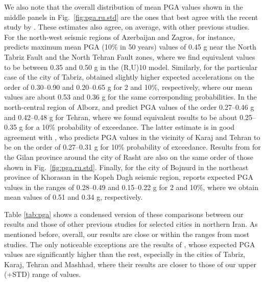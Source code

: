 We also note that the overall distribution of mean PGA values shown in the middle panels in Fig.~\ref{fig:pga.ru.std} are the ones that best agree with the recent study by \citet{Khodaverdian_2016_BSSA}. These estimates also agree, on average, with other previous studies. For the north-west seismic regions of Azerbaijan and Zagros, for instance, \citet{Tavakoli1999} predicts maximum mean PGA (10\% in 50 years) values of 0.45 g near the North Tabriz Fault and the North Tehran Fault zones, where we find equivalent values to be between 0.35 and 0.50 g in the (R,U)10 model. Similarly, for the particular case of the city of Tabriz, \citet{Vafaie2011} obtained slightly higher expected accelerations on the order of 0.30--0.90 and 0.20--0.65 g for 2 and 10\%, respectively, where our mean values are about 0.53 and 0.36 g for the same corresponding probabilities. In the north-central region of Alborz, \citet{Ghodrati2003} and \citet{Boostan2015} predict PGA values of the order 0.27--0.46 g and 0.42--0.48 g for Tehran, where we found equivalent results to be about 0.25--0.35 g for a 10\% probability of exceedance. The latter estimate is in good agreement with \citet{Abdi2013}, who predicts PGA values in the vicinity of Karaj and Tehran to be on the order of 0.27--0.31 g for 10\% probability of exceedance. Results from \citet{Ghodrati2008} for the Gilan province around the city of Rasht are also on the same order of those shown in Fig.~\ref{fig:pga.ru.std}. Finally, for the city of Bojnurd in the northeast province of Khorasan in the Kopeh Dagh seismic region, \citet{Rahgozar2012} reports expected PGA values in the ranges of 0.28--0.49 and 0.15--0.22 g for 2 and 10\%, where we obtain mean values of 0.51 and 0.34 g, respectively.

Table \ref{tab:pga} shows a condensed version of these comparisons between our results and those of other previous studies for selected cities in northern Iran. As mentioned before, overall, our results are close or within the ranges from most studies. The only noticeable exceptions are the results of \citet{Golara2014}, whose expected PGA values are significantly higher than the rest, especially in the cities of Tabriz, Karaj, Tehran and Mashhad, where their results are closer to those of our upper (+STD) range of values. 




